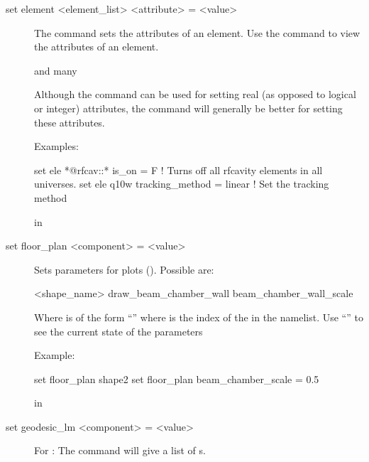 {{\begin{description}
\item[set element <element_list> <attribute> = <value>] \Newline

\vskip -0.2in

The  command sets the attributes of an element. Use the
 command to view the attributes of an element. 

 and  many


Although the  command can be used for setting real (as
opposed to logical or integer) attributes, the 
command will generally be better for setting these attributes.

Examples:
\begin{example}
  set ele *@rfcav::* is_on = F  ! Turns off all rfcavity elements in all universes.
  set ele q10w tracking_method = linear ! Set the tracking method
\end{example}


 in

\item[set floor_plan <component> = <value>] \Newline

\vskip -0.2in

Sets parameters for  plots ().
Possible  are:
\begin{example}
  <shape_name>%
  draw_beam_chamber_wall
  beam_chamber_wall_scale
\end{example}
Where  is of the form ``'' where
 is the index of the  in the
 namelist.  Use ``''
to see the current state of the  parameters

Example:
\begin{example}
  set floor_plan shape2%
  set floor_plan beam_chamber_scale = 0.5
\end{example}


 in

\item[set geodesic_lm <component> = <value>] \Newline

\vskip -0.2in

For : The  command will give a list of 
s.


\end{description}}}
